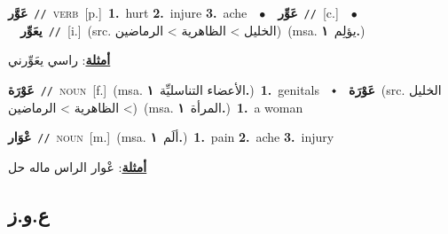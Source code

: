 \documentclass[10pt,a4paper,twoside]{article} %
\begin{document}
\begin{multicols}{2}
{\setlength\topsep{0pt}\textbf{\foreignlanguage{arabic}{عَوَّر}}\ {\color{gray}\texttt{//}\color{black}}\ \textsc{verb}\ [p.]\ \textbf{1.}~hurt  \textbf{2.}~injure  \textbf{3.}~ache\ \ $\bullet$\ \ \setlength\topsep{0pt}\textbf{\foreignlanguage{arabic}{عَوِّر}}\ {\color{gray}\texttt{//}\color{black}}\ [c.]\ \ $\bullet$\ \ \setlength\topsep{0pt}\textbf{\foreignlanguage{arabic}{يعَوِّر}}\ {\color{gray}\texttt{//}\color{black}}\ [i.]\ (src. \color{gray}\foreignlanguage{arabic}{الخليل > الظاهرية > الرماضين}\color{black})\ \color{gray}(msa. \foreignlanguage{arabic}{يؤلِم}~\foreignlanguage{arabic}{\textbf{١.}})\color{black}\  \begin{flushright}\color{gray}\foreignlanguage{arabic}{\textbf{\underline{\foreignlanguage{arabic}{أمثلة}}}: راسي يعَوِّرني}\end{flushright}\color{black}} \vspace{2mm}

{\setlength\topsep{0pt}\textbf{\foreignlanguage{arabic}{عَوْرَة}}\ {\color{gray}\texttt{//}\color{black}}\ \textsc{noun}\ [f.]\ \color{gray}(msa. \foreignlanguage{arabic}{الأعضاء التناسليِّة}~\foreignlanguage{arabic}{\textbf{١.}})\color{black}\ \textbf{1.}~genitals\ \ $\smblkdiamond$\ \ \setlength\topsep{0pt}\textbf{\foreignlanguage{arabic}{عَوْرَة}}\ (src. \color{gray}\foreignlanguage{arabic}{الخليل > الظاهرية > الرماضين}\color{black})\ \color{gray}(msa. \foreignlanguage{arabic}{المرأة}~\foreignlanguage{arabic}{\textbf{١.}})\color{black}\ \textbf{1.}~a woman\ } \vspace{2mm}

{\setlength\topsep{0pt}\textbf{\foreignlanguage{arabic}{عْوَار}}\ {\color{gray}\texttt{//}\color{black}}\ \textsc{noun}\ [m.]\ \color{gray}(msa. \foreignlanguage{arabic}{ألَم}~\foreignlanguage{arabic}{\textbf{١.}})\color{black}\ \textbf{1.}~pain  \textbf{2.}~ache  \textbf{3.}~injury\  \begin{flushright}\color{gray}\foreignlanguage{arabic}{\textbf{\underline{\foreignlanguage{arabic}{أمثلة}}}: عْوار الراس ماله حل}\end{flushright}\color{black}} \vspace{2mm}

\vspace{-3mm}
\subsection*{\color{blue}\foreignlanguage{arabic}{ع.و.ز}\color{blue}{}} 


\end{multicols}
\end{document}
